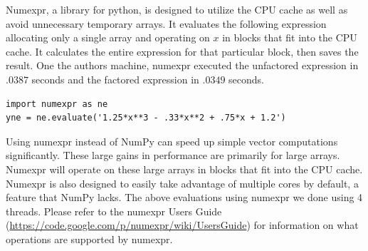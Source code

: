 Numexpr, a library for python, is designed to utilize the CPU cache as well as avoid unnecessary temporary arrays.
It evaluates the following expression allocating only a single array and operating on $x$ in blocks that fit into the CPU cache.
It calculates the entire expression for that particular block, then saves the result.
One the authors machine, numexpr executed the unfactored expression in $.0387$ seconds and the factored expression in $.0349$ seconds. 
\begin{lstlisting}
import numexpr as ne
yne = ne.evaluate('1.25*x**3 - .33*x**2 + .75*x + 1.2')
\end{lstlisting}
Using numexpr instead of NumPy can speed up simple vector computations significantly.
These large gains in performance are primarily for large arrays.  
Numexpr will operate on these large arrays in blocks that fit into the CPU cache.  
Numexpr is also designed to easily take advantage of multiple cores by default, a feature that NumPy lacks.
The above evaluations using numexpr we done using 4 threads.  
Please refer to the numexpr Users Guide (\url{https://code.google.com/p/numexpr/wiki/UsersGuide}) for information on what operations are supported by numexpr.
